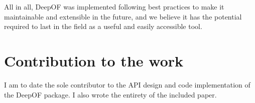 All in all, DeepOF was implemented following best practices to make it maintainable and extensible in the future, and we believe it has the potential required to last in the field as a useful and easily accessible tool.

\section{Contribution to the work}

I am to date the sole contributor to the API design and code implementation of the DeepOF package. I also wrote the entirety of the included paper.


